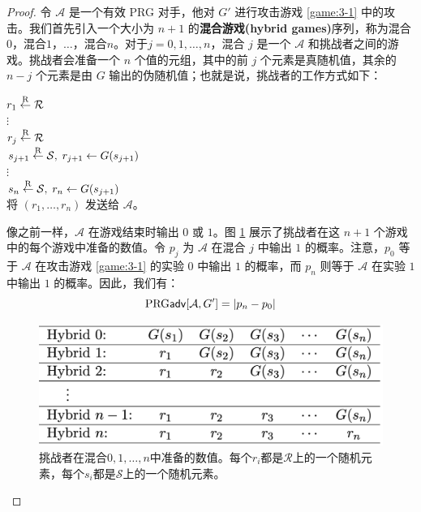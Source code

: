 \begin{proof}
令 $\mathcal A$ 是一个有效 PRG 对手，他对 $G'$ 进行攻击游戏 \ref{game:3-1} 中的攻击。我们首先引入一个大小为 $n+1$ 的\textbf{混合游戏(hybrid games)}序列，称为混合$0$，混合$1$，$\dots$，混合$n$。对于$j=0,1,\dots,n$，混合 $j$ 是一个 $\mathcal A$ 和挑战者之间的游戏。挑战者会准备一个 $n$ 个值的元组，其中的前 $j$ 个元素是真随机值，其余的 $n-j$ 个元素是由 $G$ 输出的伪随机值；也就是说，挑战者的工作方式如下：

\vspace*{5pt}

\hspace*{5pt} $r_1\overset{\rm R}\leftarrow\mathcal R$\\
\hspace*{50pt} $\vdots$\\
\hspace*{26pt} $r_j\overset{\rm R}\leftarrow\mathcal R$\\
\hspace*{26pt} $s_{j+1}\overset{\rm R}\leftarrow\mathcal{S},\;r_{j+1}\leftarrow G(s_{j+1})$\\
\hspace*{50pt} $\vdots$\\
\hspace*{26pt} $s_{n}\overset{\rm R}\leftarrow\mathcal{S},\;r_{n}\leftarrow G(s_{j+1})$\\
\hspace*{26pt} 将 $(r_1,\dots,r_n)$ 发送给 $\mathcal A$。

\vspace*{5pt}

\noindent
像之前一样，$\mathcal A$ 在游戏结束时输出 $0$ 或 $1$。图 \ref{fig:3-5} 展示了挑战者在这 $n+1$ 个游戏中的每个游戏中准备的数值。令 $p_j$ 为 $\mathcal A$ 在混合 $j$ 中输出 $1$ 的概率。注意，$p_0$ 等于 $\mathcal A$ 在攻击游戏 \ref{game:3-1} 的实验 $0$ 中输出 $1$ 的概率，而 $p_n$ 则等于 $\mathcal A$ 在实验 $1$ 中输出 $1$ 的概率。因此，我们有：
\begin{equation}\label{eq:3-9}
{\rm PRG\mathsf{adv}}[\mathcal{A},G']=|p_n-p_0|
\end{equation}

\begin{figure}
  \centering
  \includegraphics[width=0.55\linewidth]{figures/chapter3/fig5.png}
  \caption{挑战者在混合$0,1,\dots,n$中准备的数值。每个$r_i$都是$\mathcal{R}$上的一个随机元素，每个$s_i$都是$\mathcal{S}$上的一个随机元素。}
  \label{fig:3-5}
\end{figure}


\end{proof}

